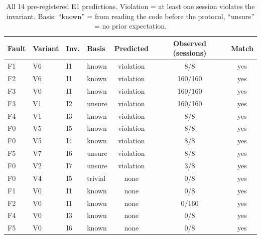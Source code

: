 \begin{table}[h]
\caption{All 14 pre-registered E1 predictions. Violation = at least one session violates the invariant. Basis: ``known'' = from reading the code before the protocol, ``unsure'' = no prior expectation.}
\centering\small
\begin{tabular}{llllccc}
\toprule
Fault & Variant & Inv. & Basis & Predicted & Observed (sessions) & Match\\
\midrule
F1 & V6 & I1 & known & violation & 8/8 & yes\\
F2 & V6 & I1 & known & violation & 160/160 & yes\\
F3 & V0 & I1 & known & violation & 160/160 & yes\\
F3 & V1 & I2 & unsure & violation & 160/160 & yes\\
F4 & V1 & I3 & known & violation & 8/8 & yes\\
F0 & V5 & I5 & known & violation & 8/8 & yes\\
F0 & V5 & I4 & known & violation & 8/8 & yes\\
F5 & V7 & I6 & unsure & violation & 8/8 & yes\\
F0 & V2 & I7 & unsure & violation & 3/8 & yes\\
F0 & V4 & I5 & trivial & none & 0/8 & yes\\
F1 & V0 & I1 & known & none & 0/8 & yes\\
F2 & V0 & I1 & known & none & 0/160 & yes\\
F4 & V0 & I3 & known & none & 0/8 & yes\\
F5 & V0 & I6 & known & none & 0/8 & yes\\
\bottomrule
\end{tabular}
\end{table}
